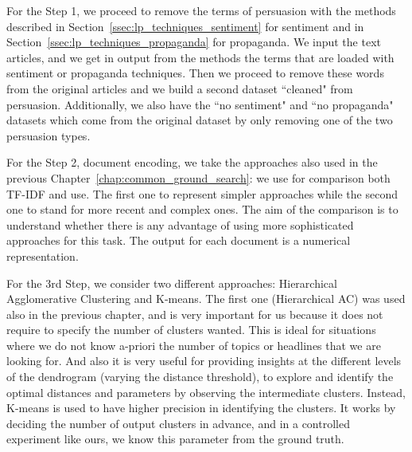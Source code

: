 

For the Step 1, we proceed to remove the terms of persuasion with the methods described in Section~\ref{ssec:lp_techniques_sentiment} for sentiment and in Section~\ref{ssec:lp_techniques_propaganda} for propaganda. We input the text articles, and we get in output from the methods the terms that are loaded with sentiment or propaganda techniques. Then we proceed to remove these words from the original articles and we build a second dataset ``cleaned" from persuasion. Additionally, we also have the ``no sentiment" and ``no propaganda" datasets which come from the original dataset by only removing one of the two persuasion types.

For the Step 2, document encoding, we take the approaches 
also used in the previous Chapter~\ref{chap:common_ground_search}: we use for comparison both TF-IDF and \acrshort{use}. The first one to represent simpler approaches while the second one to stand for more recent and complex ones. The aim of the comparison is to understand whether there is any advantage of using more sophisticated approaches for this task.
The output for each document is a numerical representation.

For the 3rd Step, we consider two different approaches: Hierarchical Agglomerative Clustering and K-means. The first one (Hierarchical AC) was used also in the previous chapter, and is very important for us because it does not require to specify the number of clusters wanted. This is ideal for situations where we do not know a-priori the number of topics or headlines that we are looking for. And also it is very useful for providing insights at the different levels of the dendrogram (varying the distance threshold), to explore and identify the optimal distances and parameters by observing the intermediate clusters.
Instead, K-means is used to have higher precision in identifying the clusters. It works by deciding the number of output clusters in advance, and in a controlled experiment like ours, we know this parameter from the ground truth. %

